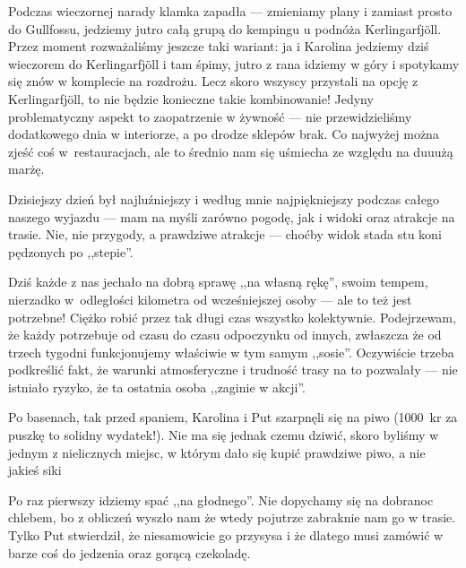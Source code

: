 Podczas wieczornej narady klamka zapadła --- zmieniamy plany i zamiast prosto do Gullfossu, jedziemy jutro całą grupą do kempingu u podnóża Kerlingarfjöll. Przez moment rozważaliśmy jeszcze taki wariant: ja i Karolina jedziemy dziś wieczorem do Kerlingarfjöll i tam śpimy, jutro z rana idziemy w góry i spotykamy się znów w komplecie na rozdrożu. Lecz skoro wszyscy przystali na opcję z Kerlingarfjöll, to nie będzie konieczne takie kombinowanie! Jedyny problematyczny aspekt to zaopatrzenie w żywność --- nie przewidzieliśmy dodatkowego dnia w interiorze, a po drodze sklepów brak. Co najwyżej można zjeść coś w~restauracjach, ale to średnio nam się uśmiecha ze względu na duuużą marżę.

Dzisiejszy dzień był najluźniejszy i według mnie najpiękniejszy podczas całego naszego wyjazdu --- mam na myśli zarówno pogodę, jak i widoki oraz atrakcje na trasie. Nie, nie przygody, a prawdziwe atrakcje --- choćby widok stada stu koni pędzonych po ,,stepie''.

Dziś każde z nas jechało na dobrą sprawę ,,na własną rękę'', swoim tempem, nierzadko w~odległości kilometra od wcześniejszej osoby --- ale to też jest potrzebne! Ciężko robić przez tak długi czas wszystko kolektywnie. Podejrzewam, że każdy potrzebuje od czasu do czasu odpoczynku od innych, zwłaszcza że od trzech tygodni funkcjonujemy właściwie w tym samym ,,sosie''. Oczywiście trzeba podkreślić fakt, że warunki atmosferyczne i trudność trasy na to pozwalały --- nie istniało ryzyko, że ta ostatnia osoba ,,zaginie w akcji''.

Po basenach, tak przed spaniem, Karolina i Put szarpnęli się na piwo (1000~kr za puszkę to solidny wydatek!). Nie ma się jednak czemu dziwić, skoro byliśmy w jednym z nielicznych miejsc, w którym dało się kupić prawdziwe piwo, a nie jakieś siki\textellipsis

Po raz pierwszy idziemy spać ,,na głodnego''. Nie dopychamy się na dobranoc chlebem, bo z obliczeń wyszło nam że wtedy pojutrze zabraknie nam go w trasie. Tylko Put stwierdził, że niesamowicie go przysysa i że dlatego musi zamówić w barze coś do jedzenia oraz gorącą czekoladę.
